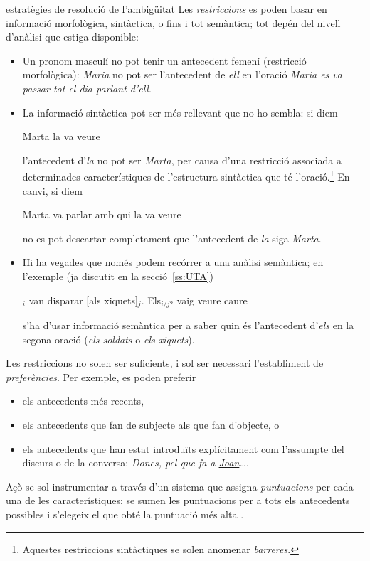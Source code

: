 \begin{persabermes}{estratègies de resolució de l'ambigüitat}
  Les \emph{restriccions} es poden basar en informació morfològica,
  sintàctica, o fins i tot semàntica; tot depén del nivell d'anàlisi
  que estiga disponible:
  \begin{itemize}
  \item Un pronom masculí no pot tenir un antecedent femení
    (restricció morfològica): \emph{Maria} no pot ser l'antecedent de
    \emph{ell} en l'oració \emph{Maria es va passar tot el dia parlant
      d'ell}.
  \item La informació sintàctica pot ser més rellevant que no ho
    sembla: si diem
    \begin{exemple}
      Marta la va veure
    \end{exemple} 
    l'antecedent d'\emph{la} no pot ser \emph{Marta}, per causa d'una
    restricció associada a determinades característiques de
    l'estructura sintàctica que té l'oració.\footnote{Aquestes
      restriccions sintàctiques se solen anomenar \emph{barreres}.}
    En canvi, si diem
    \begin{exemple}
      Marta va parlar amb qui la va veure
    \end{exemple} 
    no es pot descartar completament que l'antecedent de \emph{la}
    siga \emph{Marta}.
  \item Hi ha vegades que només podem recórrer a una anàlisi
    semàntica; en l'exemple (ja discutit en la secció~\ref{ss:UTA})
    \begin{exemple} 
      $_i$ van disparar [als xiquets]$_j$. Els$_{i/j?}$
      vaig veure caure
    \end{exemple}
    s'ha d'usar informació semàntica per a saber quin és l'antecedent
    d'\emph{els} en la segona oració (\emph{els soldats} o \emph{els
      xiquets}).
  \end{itemize}

  Les restriccions no solen ser suficients, i sol ser necessari
  l'establiment de \emph{preferències}. Per exemple, es poden preferir
  \begin{itemize}
  \item els antecedents més recents,
  \item els antecedents que fan de subjecte als que fan d'objecte, o
  \item els antecedents que han estat introduïts explícitament com
    l'assumpte del discurs o de la conversa: \emph{Doncs, pel que fa a
      \underline{Joan}\ldots}.
  \end{itemize}
  Açò se sol instrumentar a través d'un sistema que assigna
  \emph{puntuacions} per cada una de les característiques: se sumen
  les puntuacions per a tots els antecedents possibles i s'elegeix el
  que obté la puntuació més alta \citep{lappin94j}.


\end{persabermes}
